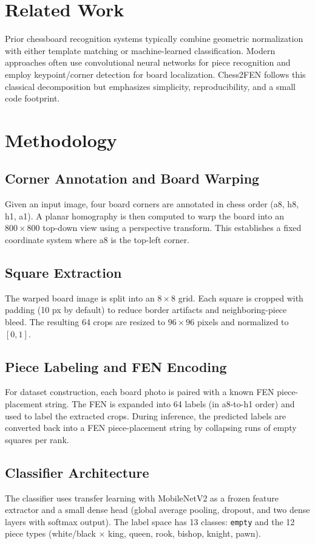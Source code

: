 \documentclass[conference]{IEEEtran}
\begin{document}
\section{Related Work}
Prior chessboard recognition systems typically combine geometric normalization with either template matching or machine-learned classification. Modern approaches often use convolutional neural networks for piece recognition and employ keypoint/corner detection for board localization. Chess2FEN follows this classical decomposition but emphasizes simplicity, reproducibility, and a small code footprint.

\section{Methodology}
\subsection{Corner Annotation and Board Warping}
Given an input image, four board corners are annotated in chess order (a8, h8, h1, a1). A planar homography is then computed to warp the board into an $800\times800$ top-down view using a perspective transform. This establishes a fixed coordinate system where a8 is the top-left corner.

\subsection{Square Extraction}
The warped board image is split into an $8\times8$ grid. Each square is cropped with padding (10 px by default) to reduce border artifacts and neighboring-piece bleed. The resulting 64 crops are resized to $96\times96$ pixels and normalized to $[0,1]$.

\subsection{Piece Labeling and FEN Encoding}
For dataset construction, each board photo is paired with a known FEN piece-placement string. The FEN is expanded into 64 labels (in a8-to-h1 order) and used to label the extracted crops. During inference, the predicted labels are converted back into a FEN piece-placement string by collapsing runs of empty squares per rank.

\subsection{Classifier Architecture}
The classifier uses transfer learning with MobileNetV2 as a frozen feature extractor and a small dense head (global average pooling, dropout, and two dense layers with softmax output). The label space has 13 classes: \texttt{empty} and the 12 piece types (white/black $\times$ king, queen, rook, bishop, knight, pawn).
\end{document}
